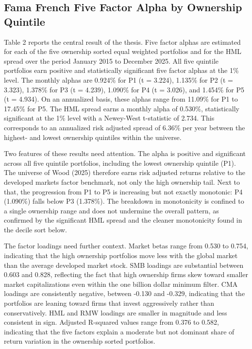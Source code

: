 


\subsection{Fama French Five Factor Alpha by Ownership Quintile}

Table 2 reports the central result of the thesis. Five factor alphas are estimated for each of the five ownership sorted equal weighted portfolios and for the HML spread over the period January 2015 to December 2025. All five quintile portfolios earn positive and statistically significant five factor alphas at the 1\% level. The monthly alphas are 0.924\% for P1 (t = 3.224), 1.135\% for P2 (t = 3.323), 1.378\% for P3 (t = 4.239), 1.090\% for P4 (t = 3.026), and 1.454\% for P5 (t = 4.934). On an annualized basis, these alphas range from 11.09\% for P1 to 17.45\% for P5. The HML spread earns a monthly alpha of 0.530\%, statistically significant at the 1\% level with a Newey-West t-statistic of 2.734. This corresponds to an annualized risk adjusted spread of 6.36\% per year between the highest- and lowest ownership quintiles within the universe.



Two features of these results need attention. The alpha is positive and significant across all five quintile portfolios, including the lowest ownership quintile (P1). The universe of Wood (2025) therefore earns risk adjusted returns relative to the developed markets factor benchmark, not only the high ownership tail. Next to that, the progression from P1 to P5 is increasing but not exactly monotonic: P4 (1.090\%) falls below P3 (1.378\%). The breakdown in monotonicity is confined to a single ownership range and does not undermine the overall pattern, as confirmed by the significant HML spread and the cleaner monotonicity found in the decile sort below.

The factor loadings need further context. Market betas range from 0.530 to 0.754, indicating that the high ownership portfolios move less with the global market than the average developed market stock. SMB loadings are substantial between 0.603 and 0.828, reflecting the fact that high ownership firms skew toward smaller market capitalizations even within the one billion dollar minimum filter. CMA loadings are consistently negative, between -0.130 and -0.329, indicating that the portfolios are leaning toward firms that invest aggressively rather than conservatively. HML and RMW loadings are smaller in magnitude and less consistent in sign. Adjusted R-squared values range from 0.376 to 0.582, indicating that the five factors explain a moderate but not dominant share of return variation in the ownership sorted portfolios.


